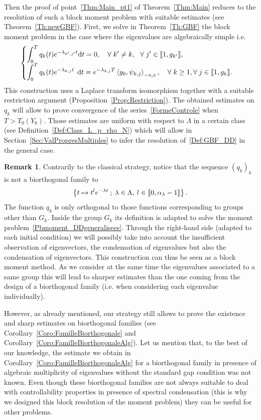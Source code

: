 \documentclass[11pt]{article}
\theoremstyle{definition}
\newtheorem{rema}[theo]{Remark}
\numberwithin{equation}{section}
\numberwithin{figure}{section}
\numberwithin{table}{section}
\newcommand{\llbracket}{\mathopen{[\mkern -2.7mu[}}
\newcommand{\rrbracket}{\mathclose{]\mkern -2.7mu]}}
\newcommand{\inter}[2]{\llbracket #1,#2 \rrbracket}
\newcommand{\Fzp}{Y_0}
\newcommand{\dual}[2]{\left\langle #1, #2 \right\rangle_{-\diamond,\diamond}}
\newcommand{\n}{g}
\newcommand{\md}{\mathrm{d}}
\let\oldforall\forall
\renewcommand*{\forall}{\mathrel{\oldforall}}
\begin{document}
Then the proof of point~\eqref{Thm:Main_pt1} of Theorem~\ref{Thm:Main} reduces to the resolution of such a block moment problem with suitable estimates (see Theorem~\ref{Th:newGBF}). First, we solve in Theorem~\ref{Th:GBF} the block moment problem in the case where the eigenvalues are algebraically simple i.e.
\begin{equation}\label{Def:GBF}
\begin{cases}
\displaystyle\int_0^T q_k(t) e^{-\lambda_{k',j'} t} \md t = 0, \quad \forall k' \neq k, \ \ \forall j'\in \inter{1}{\n_{k'}},
\\[0.15em]
\displaystyle \int_0^T q_k(t) e^{-\lambda_{k,j} t} \;\,\md t = e^{-\lambda_{k,j}T} \dual{y_0}{\psi_{k,j}}, \quad \forall k \geq 1, \forall j \in \inter{1}{\n_k}.
\end{cases}
\end{equation}
This construction uses a Laplace transform isomorphism together with a suitable restriction argument (Proposition~\ref{Prop:Restriction}). The obtained estimates on $q_k$ will allow to prove convergence of the series~\eqref{FormeControle} when $T>T_0(\Fzp)$. Those estimates are uniform with respect to $\Lambda$ in a certain class (see Definition~\ref{Def:Class_L_p_rho_N}) which will allow in Section~\ref{Sec:ValPropresMultiples} to infer the resolution of~\eqref{Def:GBF_DD} in the general case.

\begin{rema}
Contrarily to the classical strategy, notice that the sequence $(q_k)_k$ is not a biorthogonal family to
\[
\left\{ t \mapsto t^l e^{-\lambda t} \: ; \: \lambda \in \Lambda, \: l \in \inter{0}{\alpha_\lambda -1} \right\}.
\]
The function $q_k$ is only orthogonal to those functions corresponding to groups other than $G_k$. Inside the group $G_k$ its definition is adapted to solve the moment problem~\eqref{Pbmoment_DDgeneralisees}. Through the right-hand side (adapted to each initial condition) we will possibly take into account the insufficient observation of eigenvectors, the condensation of eigenvalues but also the condensation of eigenvectors. This construction can thus be seen as a block moment method. As we consider at the same time the eigenvalues associated to a same group this will lead to sharper estimates than the one coming from the design of a biorthogonal family (i.e. when considering each eigenvalue individually).

However, as already mentioned, our strategy still allows to prove the existence and sharp estimates on biorthogonal families (see Corollary~\ref{Coro:FamilleBiorthogonale} and Corollary~\ref{Coro:FamilleBiorthogonaleAlg}). Let us mention that, to the best of our knowledge, the estimate we obtain in Corollary~\ref{Coro:FamilleBiorthogonaleAlg} for a biorthogonal family in presence of algebraic multiplicity of eigenvalues without the standard gap condition was not known. Even though these biorthogonal families are not always suitable to deal with controllability properties in presence of spectral condensation (this is why we designed this block resolution of the moment problem) they can be useful for other problems.
\end{rema}
\end{document}
